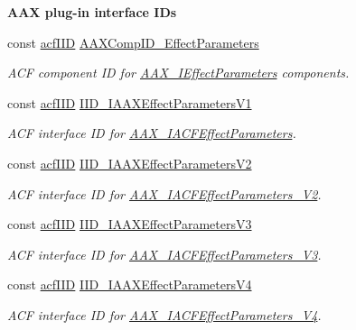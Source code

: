 \begin{Indent}\textbf{ A\+AX plug-\/in interface I\+Ds}\par
\begin{DoxyCompactItemize}
\item 
const \mbox{\hyperlink{a00269_a59df0b41744eee7a066787aaedf97f67}{acf\+I\+ID}} \mbox{\hyperlink{a00683_a0f9ba8a7c2177a0fa5042461968fa8ad}{A\+A\+X\+Comp\+I\+D\+\_\+\+Effect\+Parameters}}
\begin{DoxyCompactList}\small\item\em A\+CF component ID for \mbox{\hyperlink{a01825}{A\+A\+X\+\_\+\+I\+Effect\+Parameters}} components. \end{DoxyCompactList}\item 
const \mbox{\hyperlink{a00269_a59df0b41744eee7a066787aaedf97f67}{acf\+I\+ID}} \mbox{\hyperlink{a00683_a8379d320e9eabb19428d005fb6499f88}{I\+I\+D\+\_\+\+I\+A\+A\+X\+Effect\+Parameters\+V1}}
\begin{DoxyCompactList}\small\item\em A\+CF interface ID for \mbox{\hyperlink{a01669}{A\+A\+X\+\_\+\+I\+A\+C\+F\+Effect\+Parameters}}. \end{DoxyCompactList}\item 
const \mbox{\hyperlink{a00269_a59df0b41744eee7a066787aaedf97f67}{acf\+I\+ID}} \mbox{\hyperlink{a00683_a71e92973a70cd9f2fc704b2cf36a5b9a}{I\+I\+D\+\_\+\+I\+A\+A\+X\+Effect\+Parameters\+V2}}
\begin{DoxyCompactList}\small\item\em A\+CF interface ID for \mbox{\hyperlink{a01677}{A\+A\+X\+\_\+\+I\+A\+C\+F\+Effect\+Parameters\+\_\+\+V2}}. \end{DoxyCompactList}\item 
const \mbox{\hyperlink{a00269_a59df0b41744eee7a066787aaedf97f67}{acf\+I\+ID}} \mbox{\hyperlink{a00683_ad49630ca225ea71d751debb379d04192}{I\+I\+D\+\_\+\+I\+A\+A\+X\+Effect\+Parameters\+V3}}
\begin{DoxyCompactList}\small\item\em A\+CF interface ID for \mbox{\hyperlink{a01681}{A\+A\+X\+\_\+\+I\+A\+C\+F\+Effect\+Parameters\+\_\+\+V3}}. \end{DoxyCompactList}\item 
const \mbox{\hyperlink{a00269_a59df0b41744eee7a066787aaedf97f67}{acf\+I\+ID}} \mbox{\hyperlink{a00683_a852f037a3570b88ca1df6186bb524460}{I\+I\+D\+\_\+\+I\+A\+A\+X\+Effect\+Parameters\+V4}}
\begin{DoxyCompactList}\small\item\em A\+CF interface ID for \mbox{\hyperlink{a01685}{A\+A\+X\+\_\+\+I\+A\+C\+F\+Effect\+Parameters\+\_\+\+V4}}. \end{DoxyCompactList}\item 

\end{DoxyCompactItemize}
\end{Indent}
